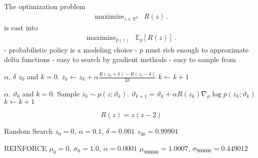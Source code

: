 \documentclass[aspectratio=169,8pt]{beamer}
\newcommand{\R}{\mathbb{R}}
\begin{document}
The optimization problem
\begin{equation*}
\begin{array}{ll}
	\mbox{maximize}_{z\in\R^d} & R(z) \,.
\end{array}
\end{equation*}
is cast into
\begin{equation*}
\begin{array}{ll}
	\mbox{maximize}_{p(z)} & \mathbb{E}_p[R(z)] \,.
\end{array}
\end{equation*}
- probabilistic policy is a modeling choice \newline
- $p$ must rich enough to approximate delta functions \newline
- easy to search by gradient methods \newline
- easy to sample from \newline
\eframe

\begin{algorithmic}[1]
 $\alpha$, $\delta$
 $z_0$ and $k = 0$.
\STATE $z_k \leftarrow z_k + \alpha \frac{R(z_k + \delta) - R(z_k - \delta)}{2 \delta}$
\STATE $k\leftarrow k + 1$
\ENDWHILE
\end{algorithmic}
\eframe

\begin{algorithmic}[1]
 $\alpha$.
 $\vartheta_0$ and $k = 0$.
\STATE Sample $z_k\sim p(z;\vartheta_k)$.
\STATE $\vartheta_{k+1} = \vartheta_k + \alpha R(z_k) \nabla_\vartheta \log p(z_k; \vartheta_k)$
\STATE $k\leftarrow k + 1$
\ENDWHILE
\end{algorithmic}
\eframe

\begin{equation*}
  R(z) = z (z - 2)
\end{equation*}

Random Search \newline
$z_0 = 0$, $\alpha = 0.1$, $\delta = 0.001$ \newline
$z_{30} = 0.99901$ \newline

REINFORCE \newline
$\mu_0 = 0$, $\sigma_0 = 1.0$, $\alpha = 0.0001$ \newline
$\mu_{900000} = 1.0007$,  $\sigma_{900000} = 0.449012$ \newline
\end{document}

